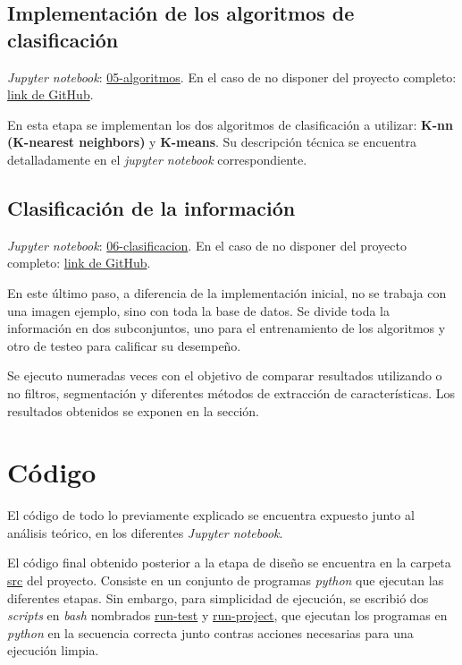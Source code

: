 \documentclass[10pt,a4paper]{article}
\begin{document}
\subsection{Implementación de los algoritmos de clasificación}
\textit{Jupyter notebook}: \href{./05-algoritmos.ipynb}{05-algoritmos}. En el caso de no disponer del proyecto completo: \href{https://github.com/FernandezGFG/fruit-classifier/blob/master/05-algoritmos.ipynb}{link de GitHub}.

En esta etapa se implementan los dos algoritmos de clasificación a utilizar: \textbf{K-nn (K-nearest neighbors)} y \textbf{K-means}. Su descripción técnica se encuentra detalladamente en el \textit{jupyter notebook} correspondiente.

\subsection{Clasificación de la información}
\textit{Jupyter notebook}: \href{./06-clasificacion.ipynb}{06-clasificacion}. En el caso de no disponer del proyecto completo: \href{https://github.com/FernandezGFG/fruit-classifier/blob/master/06-clasificacion.ipynb}{link de GitHub}.

En este último paso, a diferencia de la implementación inicial, no se trabaja con una imagen ejemplo, sino con toda la base de datos. Se divide toda la información en dos subconjuntos, uno para el entrenamiento de los algoritmos y otro de testeo para calificar su desempeño.

Se ejecuto numeradas veces con el objetivo de comparar resultados utilizando o no filtros, segmentación y diferentes métodos de extracción de características. Los resultados obtenidos se exponen en la sección.

\section{Código}
El código de todo lo previamente explicado se encuentra expuesto junto al análisis teórico, en los diferentes \textit{Jupyter notebook}.

El código final obtenido posterior a la etapa de diseño se encuentra en la carpeta \href{./src/}{src} del proyecto. Consiste en un conjunto de programas \textit{python} que ejecutan las diferentes etapas. Sin embargo, para simplicidad de ejecución, se escribió dos \textit{scripts} en \textit{bash} nombrados \href{./run-test}{run-test} y \href{./run-project}{run-project}, que ejecutan los programas en \textit{python} en la secuencia correcta junto contras acciones necesarias para una ejecución limpia.
\end{document}
